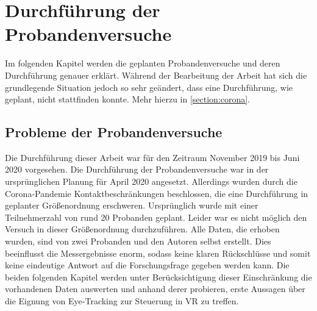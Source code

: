 
\chapter{Durchführung  der Probandenversuche} 
Im folgenden Kapitel werden die geplanten Probandenversuche und deren Durchführung genauer erklärt. Während der Bearbeitung der Arbeit hat sich die grundlegende Situation jedoch so sehr geändert, dass eine Durchführung, wie geplant, nicht stattfinden konnte. Mehr hierzu in \autoref{section:corona}.

\section{Probleme der Probandenversuche}
\label{section:corona}
Die Durchführung dieser Arbeit war für den Zeitraum November 2019 bis Juni 2020 vorgesehen. Die Durchführung der Probandenversuche war in der ursprünglichen Planung für April 2020 angesetzt. Allerdings wurden durch die Corona-Pandemie \cite{rki.2020} Kontaktbeschränkungen beschlossen, die eine Durchführung in geplanter Größenordnung erschweren. Ursprünglich wurde mit einer Teilnehmerzahl von rund 20 Probanden geplant. Leider war es nicht möglich den Versuch in dieser Größenordnung durchzuführen. Alle Daten, die erhoben wurden, sind von zwei Probanden und den Autoren selbst erstellt. Dies beeinflusst die Messergebnisse enorm, sodass keine klaren Rückschlüsse und somit keine eindeutige Antwort auf die Forschungsfrage gegeben werden kann. Die beiden folgenden Kapitel werden unter Berücksichtigung dieser Einschränkung die vorhandenen Daten auswerten und anhand derer probieren, erste Aussagen über die Eignung von Eye-Tracking zur Steuerung in \ac{VR} zu treffen.

